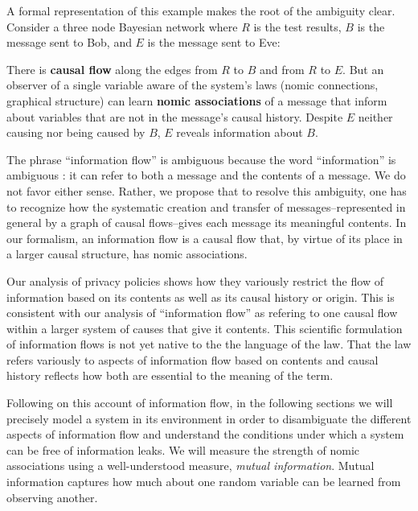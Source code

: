 \documentclass[../thesis.tex]{subfiles}
\begin{document}
A formal representation of this example makes the
root of the ambiguity clear.
Consider a three node Bayesian network where $R$ is the test
results, $B$ is the message sent to Bob, and $E$ is
the message sent to Eve:
\begin{center}
\end{center}
There is \textbf{causal flow} along the edges from
$R$ to $B$ and from $R$ to $E$.
But an observer of a single variable aware of the
system's laws (nomic connections,
graphical structure) can learn \textbf{nomic associations}
of a message that inform about variables that
are not in the message's causal history.
Despite $E$ neither causing nor being caused by $B$,
$E$ reveals information about $B$.

The phrase ``information flow'' is ambiguous because the
word ``information'' is ambiguous \cite{nunberg1996farewell}:
it can refer to both a message and the contents of a message.
We do not favor either sense.
Rather, we propose that to resolve this ambiguity,
one has to recognize how the systematic creation and
transfer of messages--represented in general by a graph
of causal flows--gives each message its meaningful
contents.
In our formalism, an information flow is a causal flow
that, by virtue of its place in a larger causal structure,
has nomic associations.

Our analysis of privacy policies shows how
they variously restrict the flow
of information based on its contents as well as its
causal history or origin.
This is consistent with our analysis of ``information flow''
as refering to one causal flow within a larger system
of causes that give it contents.
This scientific formulation of information flows is not
yet native to the the language of the law.
That the law refers variously to aspects of information flow
based on contents and causal history reflects how
both are essential to the meaning of the term.

Following on this account of information flow,
in the following sections we will precisely model a system
in its environment
in order to disambiguate the different
aspects of information flow and understand the conditions
under which a system can be free of information leaks.
We will measure the strength of
nomic associations using a well-understood measure,
\emph{mutual information}.
Mutual information 
captures how much about one random variable can be
learned from observing another.
\end{document}
